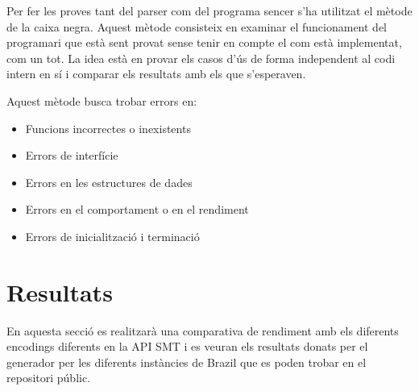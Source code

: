 \documentclass[11pt,a4paper,twoside]{report}
\begin{document}
   Per fer les proves tant del parser com del programa sencer s'ha utilitzat el mètode de la caixa negra\cite{wiki:blackbox}. Aquest mètode consisteix en examinar el funcionament del programari que està sent provat sense tenir en compte el com està implementat, com un tot. 
   La idea està en provar els casos d'ús de forma independent al codi intern en sí i comparar els resultats amb els que s'esperaven.
   
   Aquest mètode busca trobar errors en:
    \begin{itemize}
      \item Funcions incorrectes o inexistents
      \item Errors de interfície
      \item Errors en les estructures de dades
      \item Errors en el comportament o en el rendiment
      \item Errors de inicialització i terminació
    \end{itemize}


  
    
  \chapter{Resultats}
   
   

  En aquesta secció es realitzarà una comparativa de rendiment amb els diferents encodings diferents en la API SMT i es veuran els resultats donats per el generador per les diferents instàncies de Brazil que es poden trobar en el repositori públic.
\end{document}
